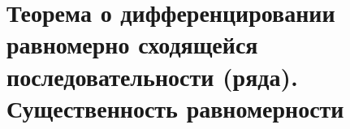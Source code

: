 \section{Теорема о дифференцировании равномерно сходящейся последовательности (ряда). Существенность равномерности}
